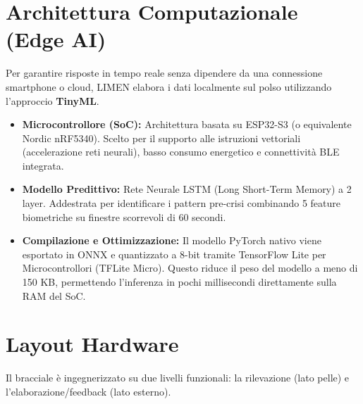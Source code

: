 \documentclass[12pt,a4paper]{article}
\begin{document}
\newpage
\tableofcontents
\newpage


\section{Architettura Computazionale (Edge AI)}
Per garantire risposte in tempo reale senza dipendere da una connessione smartphone o cloud, LIMEN elabora i dati localmente sul polso utilizzando l'approccio \textbf{TinyML}.

\begin{itemize}
    \item \textbf{Microcontrollore (SoC):} Architettura basata su ESP32-S3 (o equivalente Nordic nRF5340). Scelto per il supporto alle istruzioni vettoriali (accelerazione reti neurali), basso consumo energetico e connettività BLE integrata.
    \item \textbf{Modello Predittivo:} Rete Neurale LSTM (Long Short-Term Memory) a 2 layer. Addestrata per identificare i pattern pre-crisi combinando 5 feature biometriche su finestre scorrevoli di 60 secondi.
    \item \textbf{Compilazione e Ottimizzazione:} Il modello PyTorch nativo viene esportato in ONNX e quantizzato a 8-bit tramite TensorFlow Lite per Microcontrollori (TFLite Micro). Questo riduce il peso del modello a meno di 150 KB, permettendo l'inferenza in pochi millisecondi direttamente sulla RAM del SoC.
\end{itemize}

\section{Layout Hardware}
Il bracciale è ingegnerizzato su due livelli funzionali: la rilevazione (lato pelle) e l'elaborazione/feedback (lato esterno).
\end{document}
